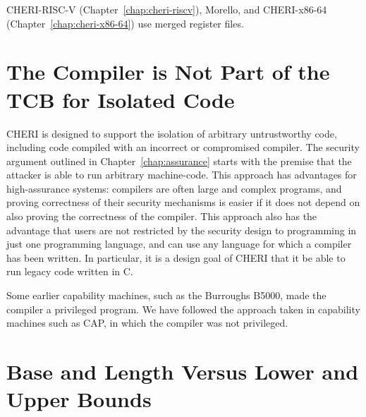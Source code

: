 CHERI-RISC-V (Chapter~\ref{chap:cheri-riscv}),
Morello, and CHERI-x86-64 (Chapter~\ref{chap:cheri-x86-64}) use merged register files.

\section{The Compiler is Not Part of the TCB for Isolated Code}

CHERI is designed to support the isolation of arbitrary untrustworthy code,
including code compiled with an incorrect or compromised compiler.
The security argument outlined in
Chapter~\ref{chap:assurance} starts with the premise that the attacker is able to
run arbitrary machine-code. This approach has advantages for high-assurance systems:
compilers are often large and complex programs, and proving correctness of their
security mechanisms is easier if it does not depend on also proving the correctness
of the compiler. This approach also has the advantage that users are not restricted
by the security design to programming in just one programming language, and can use
any language for which a compiler has been written. In particular, it is a design
goal of CHERI that it be able to run legacy code written in C.

Some earlier capability machines, such as the Burroughs B5000, made the compiler
a privileged program. We have followed the approach taken in capability machines
such as CAP, in which the compiler was not privileged.


\section{Base and Length Versus Lower and Upper Bounds}

